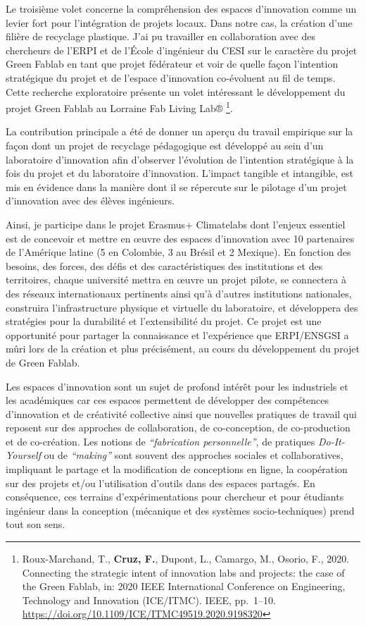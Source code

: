 \documentclass[
  12pt,
  oneside]{book}
\begin{document}
Le troisième volet concerne la compréhension des espaces d'innovation comme un levier fort pour l'intégration de projets locaux. Dans notre cas, la création d'une filière de recyclage plastique.
J'ai pu travailler en collaboration avec des chercheurs de l'ERPI et de l'École d'ingénieur du CESI sur le caractère du projet Green Fablab en tant que projet fédérateur et voir de quelle façon l'intention stratégique du projet et de l'espace d'innovation co-évoluent au fil de temps. Cette recherche exploratoire présente un volet intéressant le développement du projet Green Fablab au Lorraine Fab Living Lab® \footnote{Roux-Marchand, T., \textbf{Cruz, F.}, Dupont, L., Camargo, M., Osorio, F., 2020. Connecting the strategic intent of innovation labs and projects: the case of the Green Fablab, in: 2020 IEEE International Conference on Engineering, Technology and Innovation (ICE/ITMC). IEEE, pp.~1--10. \url{https://doi.org/10.1109/ICE/ITMC49519.2020.9198320}}.

La contribution principale a été de donner un aperçu du travail empirique sur la façon dont un projet de recyclage pédagogique est développé au sein d'un laboratoire d'innovation afin d'observer l'évolution de l'intention stratégique à la fois du projet et du laboratoire d'innovation. L'impact tangible et intangible, est mis en évidence dans la manière dont il se répercute sur le pilotage d'un projet d'innovation avec des élèves ingénieurs.

Ainsi, je participe dans le projet Erasmus+ Climatelabs dont l'enjeux essentiel est de concevoir et mettre en œuvre des espaces d'innovation avec 10 partenaires de l'Amérique latine (5 en Colombie, 3 au Brésil et 2 Mexique). En fonction des besoins, des forces, des défis et des caractéristiques des institutions et des territoires, chaque université mettra en œuvre un projet pilote, se connectera à des réseaux internationaux pertinents ainsi qu'à d'autres institutions nationales, construira l'infrastructure physique et virtuelle du laboratoire, et développera des stratégies pour la durabilité et l'extensibilité du projet. Ce projet est une opportunité pour partager la connaissance et l'expérience que ERPI/ENSGSI a mûri lors de la création et plus précisément, au cours du développement du projet de Green Fablab.

Les espaces d'innovation sont un sujet de profond intérêt pour les industriels et les académiques car ces espaces permettent de développer des compétences d'innovation et de créativité collective ainsi que nouvelles pratiques de travail qui reposent sur des approches de collaboration, de co-conception, de co-production et de co-création.
Les notions de \emph{``fabrication personnelle''}, de pratiques \emph{Do-It-Yourself} ou de \emph{``making''} sont souvent des approches sociales et collaboratives, impliquant le partage et la modification de conceptions en ligne, la coopération sur des projets et/ou l'utilisation d'outils dans des espaces partagés.
En conséquence, ces terrains d'expérimentations pour chercheur et pour étudiants ingénieur dans la conception (mécanique et des systèmes socio-techniques) prend tout son sens.
\end{document}
